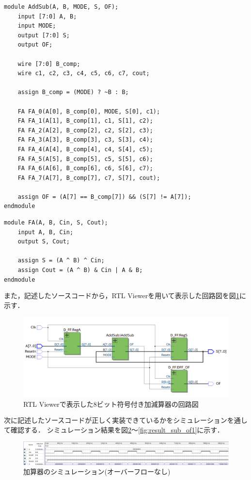 \documentclass{jlreq}
\numberwithin{equation}{section}
\begin{document}
\begin{lstlisting}[caption={AddSubの動作をするモジュール}, label={src:AddSub_sub_module}]
module AddSub(A, B, MODE, S, OF);
	input [7:0] A, B;
	input MODE;
	output [7:0] S;
	output OF;
	
	wire [7:0] B_comp;
	wire c1, c2, c3, c4, c5, c6, c7, cout;
	
	assign B_comp = (MODE) ? ~B : B;
	
	FA FA_0(A[0], B_comp[0], MODE, S[0], c1);
	FA FA_1(A[1], B_comp[1], c1, S[1], c2);
	FA FA_2(A[2], B_comp[2], c2, S[2], c3);
	FA FA_3(A[3], B_comp[3], c3, S[3], c4);
	FA FA_4(A[4], B_comp[4], c4, S[4], c5);
	FA FA_5(A[5], B_comp[5], c5, S[5], c6);
	FA FA_6(A[6], B_comp[6], c6, S[6], c7);
	FA FA_7(A[7], B_comp[7], c7, S[7], cout);
	
	assign OF = (A[7] == B_comp[7]) && (S[7] != A[7]);
endmodule
\end{lstlisting}

\begin{lstlisting}[caption={1ビット全加算器モジュール}, label={src:1bit_full_adder}]
module FA(A, B, Cin, S, Cout);
	input A, B, Cin;
	output S, Cout;
	
	assign S = (A ^ B) ^ Cin;
	assign Cout = (A ^ B) & Cin | A & B;
endmodule
\end{lstlisting}

また，記述したソースコードから，RTL Viewerを用いて表示した回路図を図\ref{fig:ripple_addsub_rtl}に示す．
\begin{figure}[H]
  \centering
  \includegraphics[width=\textwidth]{assets/ripple_addsub_rtl.png}
  \caption{RTL Viewerで表示した8ビット符号付き加減算器の回路図}
  \label{fig:ripple_addsub_rtl}
\end{figure}

次に記述したソースコードが正しく実装できているかをシミュレーションを通して確認する．
シミュレーション結果を図\ref{fig:result_adder_of0}～\ref{fig:result_sub_of1}に示す．

\begin{figure}[H]
  \centering
  \includegraphics[width=\textwidth]{assets/add_A_1_OF_0.png}
  \caption{加算器のシミュレーション(オーバーフローなし)}
  \label{fig:result_adder_of0}
\end{figure}
\end{document}
